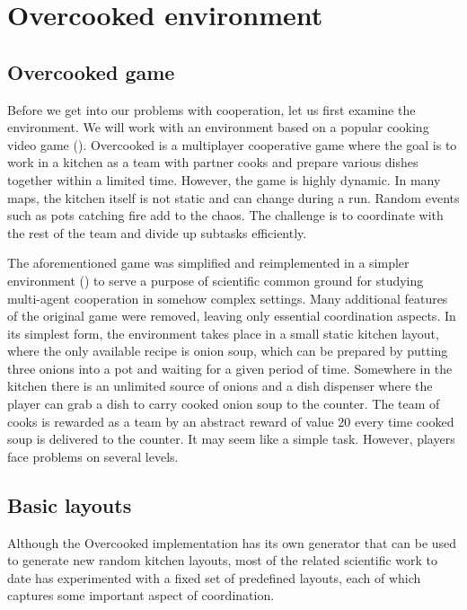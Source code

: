\chapter{Overcooked environment}\label{OvercookedChapter}

\section{Overcooked game}
Before we get into our problems with cooperation, let us first examine the environment. 
We will work with an environment based on a popular cooking video game (\cite{OvercookedGame}).
Overcooked is a multiplayer cooperative game where the goal is to work in a kitchen as a team with partner cooks and prepare various dishes together within a limited time.
However, the game is highly dynamic. In many maps, the kitchen itself is not static and can change during a run. 
Random events such as pots catching fire add to the chaos. The challenge is to coordinate with the rest of the team and divide up subtasks efficiently.

\par
The aforementioned game was simplified and reimplemented in a simpler environment (\cite{OvercookedImplementation}) to serve a purpose of scientific common ground for studying multi-agent cooperation in somehow complex settings.
Many additional features of the original game were removed, leaving only essential coordination aspects.
In its simplest form, the environment takes place in a small static kitchen layout, where the only available recipe is onion soup, which can be prepared by putting three onions into a pot and waiting for a given period of time.
Somewhere in the kitchen there is an unlimited source of onions and a dish dispenser where the player can grab a dish to carry cooked onion soup to the counter.
The team of cooks is rewarded as a team by an abstract reward of value 20 every time cooked soup is delivered to the counter. 
It may seem like a simple task. However, players face problems on several levels.

\section{Basic layouts}\label{layouts}
Although the Overcooked implementation has its own generator that can be used to generate new random kitchen layouts, most of the related scientific work to date has experimented with a fixed set of predefined layouts, each of which captures some important aspect of coordination.

